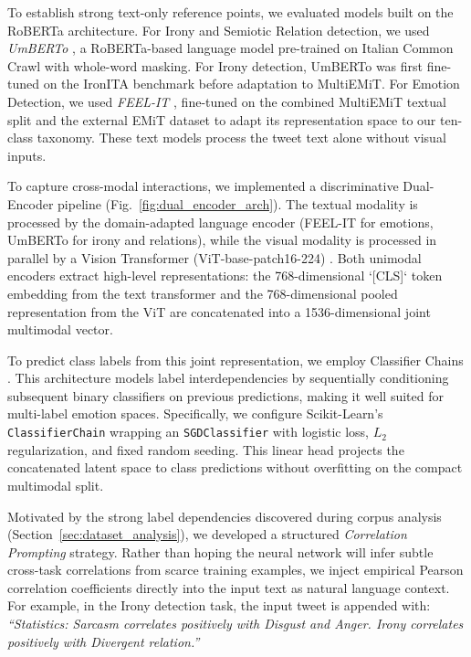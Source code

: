 To establish strong text-only reference points, we evaluated models built on the RoBERTa architecture. For Irony and Semiotic Relation detection, we used \textit{UmBERTo} \cite{musixmatch-2020-umberto}, a RoBERTa-based language model pre-trained on Italian Common Crawl with whole-word masking. For Irony detection, UmBERTo was first fine-tuned on the IronITA benchmark \cite{ironita2018} before adaptation to MultiEMiT. For Emotion Detection, we used \textit{FEEL-IT} \cite{bianchi2021feel}, fine-tuned on the combined MultiEMiT textual split and the external EMiT dataset \cite{emit} to adapt its representation space to our ten-class taxonomy. These text models process the tweet text alone without visual inputs.

To capture cross-modal interactions, we implemented a discriminative Dual-Encoder pipeline (Fig.~\ref{fig:dual_encoder_arch}). 
The textual modality is processed by the domain-adapted language encoder (FEEL-IT for emotions, UmBERTo for irony and relations), while the visual modality is processed in parallel by a Vision Transformer (ViT-base-patch16-224) \cite{dosovitskiy2021vit}.
Both unimodal encoders extract high-level representations: the 768-dimensional `[CLS]` token embedding from the text transformer and the 768-dimensional pooled representation from the ViT are concatenated into a 1536-dimensional joint multimodal vector.

To predict class labels from this joint representation, we employ Classifier Chains \cite{pedregosa2011scikit}. This architecture models label interdependencies by sequentially conditioning subsequent binary classifiers on previous predictions, making it well suited for multi-label emotion spaces. Specifically, we configure Scikit-Learn's \texttt{ClassifierChain} wrapping an \texttt{SGDClassifier} with logistic loss, $L_2$ regularization, and fixed random seeding. This linear head projects the concatenated latent space to class predictions without overfitting on the compact multimodal split.

Motivated by the strong label dependencies discovered during corpus analysis (Section~\ref{sec:dataset_analysis}), we developed a structured \textit{Correlation Prompting} strategy. Rather than hoping the neural network will infer subtle cross-task correlations from scarce training examples, we inject empirical Pearson correlation coefficients directly into the input text as natural language context. For example, in the Irony detection task, the input tweet is appended with: \textit{``Statistics: Sarcasm correlates positively with Disgust and Anger. Irony correlates positively with Divergent relation.''}


